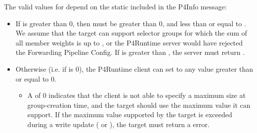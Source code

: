 \documentclass[11pt]{article}
\begin{document}
{%
\noindent{}The valid values for  depend on the static  included
in the P4Info message:%

\begin{itemize}%

\item{}
If  is greater than 0, then  must be greater than 0,
and less than or equal to . We assume that the target can
support selector groups for which the sum of all member weights is up to
, or the P4Runtime server would have rejected the Forwarding
Pipeline Config. If  is greater than , the server
must return .%

\item{}
Otherwise (i.e. if  is 0), the P4Runtime client can set
 to any value greater than or equal to 0.%

\begin{itemize}%

\item{}
A  of 0 indicates that the client is not able to specify a maximum
size at group-creation time, and the target should use the maximum value it
can support. If the maximum value supported by the target is exceeded during
a write update ( or ), the target must return a
 error.%


\end{itemize}
\end{itemize}}
\end{document}
